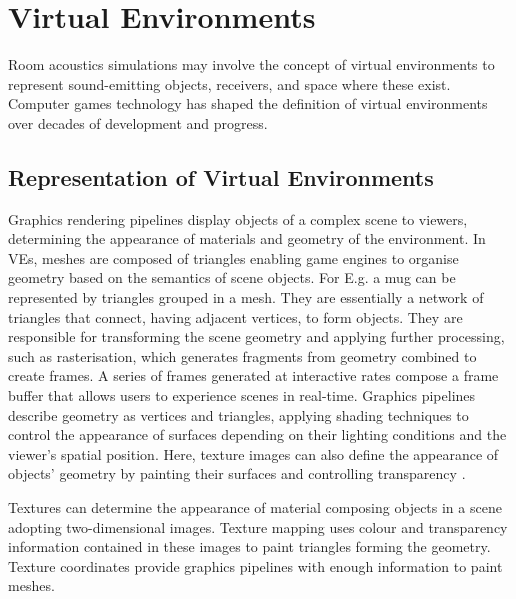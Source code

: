 \section{Virtual Environments}
Room acoustics simulations may involve the concept of virtual environments to represent sound-emitting objects, receivers, and space where these exist. Computer games technology has shaped the definition of virtual environments over decades of development and progress.

\subsection{Representation of Virtual Environments}
Graphics rendering pipelines display objects of a complex scene to viewers, determining the appearance of materials and geometry of the environment. In VEs, meshes are composed of triangles enabling game engines to organise geometry based on the semantics of scene objects. For E.g. a mug can be represented by triangles grouped in a mesh. They are essentially a network of triangles that connect, having adjacent vertices, to form objects. They are responsible for transforming the scene geometry and applying further processing, such as rasterisation, which generates fragments from geometry combined to create frames. A series of frames generated at interactive rates compose a frame buffer that allows users to experience scenes in real-time. Graphics pipelines describe geometry as vertices and triangles, applying shading techniques to control the appearance of surfaces depending on their lighting conditions and the viewer’s spatial position. Here, texture images can also define the appearance of objects' geometry by painting their surfaces and controlling transparency \citep{mcallister2002efficient, marschner2015fundamentals}.\par
Textures can determine the appearance of material composing objects in a scene adopting two-dimensional images. Texture mapping uses colour and transparency information contained in these images to paint triangles forming the geometry. Texture coordinates provide graphics pipelines with enough information to paint meshes.

